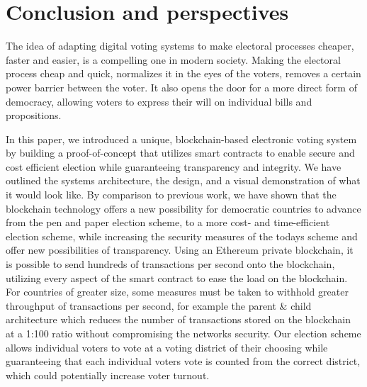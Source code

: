 \chapter{Conclusion and perspectives}

The idea of adapting digital voting systems to make electoral processes cheaper, faster and easier, is a compelling
one in modern society. Making the electoral process cheap
and quick, normalizes it in the eyes of the voters, removes a
certain power barrier between the voter. It also opens the door for a more direct form of democracy, allowing voters to express their will on individual bills and propositions.

In this paper, we introduced a unique, blockchain-based electronic voting system by building a proof-of-concept that utilizes smart contracts to enable secure and cost efficient election while guaranteeing transparency and integrity. We have outlined the systems architecture, the design, and a visual demonstration of what it would look like. By comparison to previous work, we have shown that the blockchain technology offers a new possibility for democratic countries to advance from the pen and paper election scheme, to a more cost- and time-efficient election scheme, while increasing the security measures of the todays scheme and offer new possibilities of transparency. Using an Ethereum private blockchain, it is possible to send hundreds of transactions per second onto the blockchain, utilizing every aspect of the smart contract to ease the load on the blockchain. For countries of greater size, some measures must be taken to withhold greater throughput of transactions per second, for example the parent \& child architecture which reduces the number of transactions stored on the blockchain at a 1:100 ratio without compromising the networks security. Our election scheme allows individual voters to vote at a voting district of their choosing while guaranteeing that each individual voters vote is counted from the correct district, which could potentially increase voter turnout.


